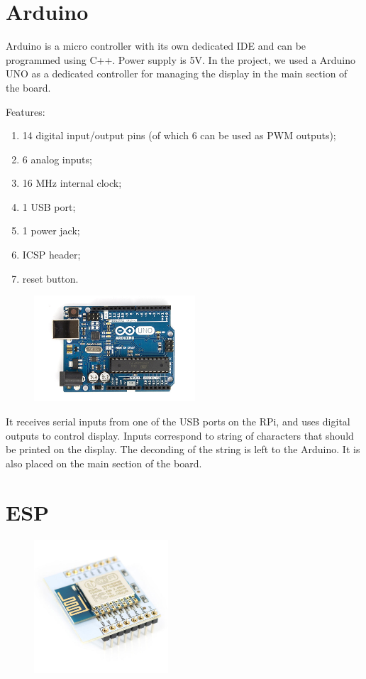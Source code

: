 \documentclass[a4paper,twoside]{book}
\begin{document}
\begin{appendices}
\section{Arduino}
\label{app:Arduino}
Arduino is a micro controller with its own dedicated IDE and can be programmed using C++. Power supply is 5V. In the project, we used a Arduino UNO as a dedicated controller for managing the display in the main section of the board. 

\beforelist Features:
\begin{enumerate}
\item 14 digital input/output pins (of which 6 can be used as PWM outputs);
\item 6 analog inputs;
\item 16 MHz internal clock;
\item 1 USB port;
\item 1 power jack;
\item ICSP header;
\item reset button.
\end{enumerate} 
\afterlist*

\begin{figure}[hb]
    \centering
    \includegraphics[width=6cm]{img/ArduinoUno}
\end{figure}

It receives serial inputs from one of the USB ports on the RPi, and uses digital outputs to control display. Inputs correspond to string of characters that should be printed on the display. The deconding of the string is left to the Arduino. 
It is also placed on the main section of the board.

\section{ESP}
\label{app:ESP}

\begin{figure}[h]
    \centering
    \includegraphics[width=5cm]{img/ESP12}
\end{figure}


\end{appendices}
\end{document}
